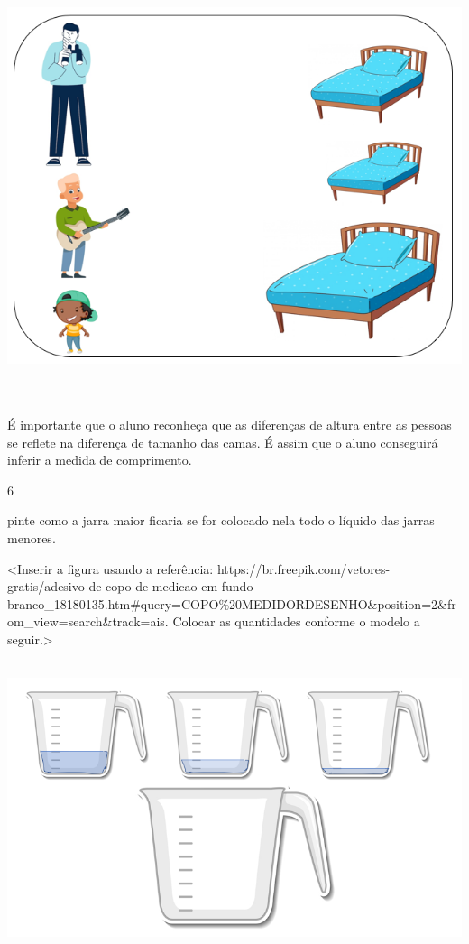 {\includegraphics[width=6.28790in,height=4.93257in]{media/image27.png}

É importante que o aluno reconheça que as diferenças de
altura entre as pessoas se reflete na diferença de tamanho das camas.
É assim que o aluno conseguirá inferir a medida de comprimento.

\num{6}

pinte como a jarra maior ficaria se for colocado nela todo o líquido das
jarras menores.

\protect\hypertarget{_heading=h.gjdgxs}{}{}\textless{}Inserir a figura
usando a referência:
https://br.freepik.com/vetores-gratis/adesivo-de-copo-de-medicao-em-fundo-branco\_18180135.htm\#query=COPO\%20MEDIDORDESENHO\&position=2\&from\_view=search\&track=ais.
Colocar as quantidades conforme o modelo a seguir.\textgreater{}

\includegraphics[width=5.90556in,height=3.37222in]{media/image28.png}

}
